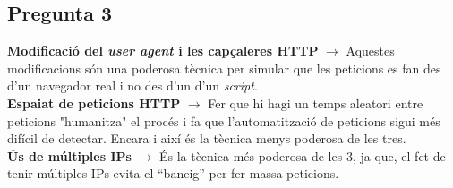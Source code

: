 \documentclass[a4paper,12pt]{report}
\begin{document}
\subsection*{Pregunta 3}
\textbf{Modificació del \textit{user agent} i les capçaleres HTTP} $\longrightarrow$ Aquestes modificacions són una poderosa tècnica per simular que les peticions es fan des d'un navegador real i no des d'un d'un \textit{script}.\\
\textbf{Espaiat de peticions HTTP} $\longrightarrow$ Fer que hi hagi un temps aleatori entre peticions "humanitza" el procés i fa que l'automatització de peticions sigui més difícil de detectar. Encara i així és la tècnica menys poderosa de les tres.\\
\textbf{Ús de múltiples IPs} $\longrightarrow$ És la tècnica més poderosa de les 3, ja que, el fet de tenir múltiples IPs evita el ``baneig'' per fer massa peticions.
\end{document}

